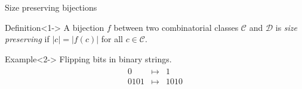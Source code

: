 \begin{frame}{Size preserving bijections}
\begin{block}{Definition}<1->
A bijection $f$ between two combinatorial classes $\mathcal{C}$ and $\mathcal{D}$ is \emph{size preserving} if $|c| = |f(c)|$ for all $c\in\mathcal{C}$.
\end{block}
\begin{block}{Example}<2->
Flipping bits in binary strings.
\begin{align*}
    \begin{array}{ccc}
        0 & \mapsto & 1  \\
        0101 & \mapsto & 1010
    \end{array}
\end{align*}
\end{block}
\end{frame}
